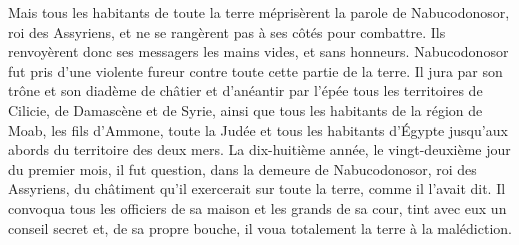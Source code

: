 Mais tous les habitants de toute la terre
		méprisèrent la parole de Nabucodonosor, roi des Assyriens,
	et ne se rangèrent pas à ses côtés pour combattre.
Ils renvoyèrent donc ses messagers les mains vides, et sans honneurs.
Nabucodonosor fut pris d’une violente fureur contre toute cette partie de la terre.
	Il jura par son trône et son diadème de châtier et d’anéantir par l’épée
	tous les territoires de Cilicie, de Damascène et de Syrie,
	ainsi que tous les habitants de la région de Moab, les fils d’Ammone, toute la Judée
	et tous les habitants d’Égypte jusqu’aux abords du territoire des deux mers.
La dix-huitième année, le vingt-deuxième jour du premier mois,
	il fut question, dans la demeure de Nabucodonosor, roi des Assyriens,
	du châtiment qu’il exercerait sur toute la terre, comme il l’avait dit.
Il convoqua tous les officiers de sa maison et les grands de sa cour,
	tint avec eux un conseil secret
	et, de sa propre bouche, il voua totalement la terre à la malédiction.
